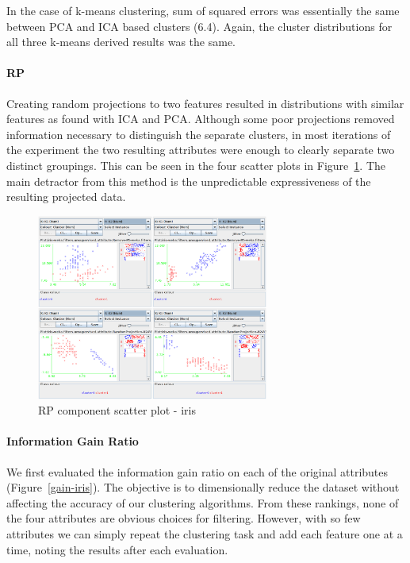\documentclass{sig-alternate}
\begin{document}
In the case of k-means clustering, sum of squared errors was essentially the same between PCA and ICA based clusters (6.4). Again, the cluster distributions for all three k-means derived results was the same.


\paragraph{RP}

Creating random projections to two features resulted in distributions with similar features as found with ICA and PCA. Although some poor projections removed information necessary to distinguish the separate clusters, in most iterations of the experiment the two resulting attributes were enough to clearly separate two distinct groupings. This can be seen in the four scatter plots in Figure~\ref{rp-scatter}. The main detractor from this method is the unpredictable expressiveness of the resulting projected data.


\begin{figure}[!htbp]
    \centering
    \includegraphics[width=3in]{part2/iris/rp.pdf}
    \caption{RP component scatter plot - iris\label{rp-scatter}}
\end{figure} 


\paragraph{Information Gain Ratio}

We first evaluated the information gain ratio on each of the original attributes (Figure~\ref{gain-iris}). The objective is to dimensionally reduce the dataset without affecting the accuracy of our clustering algorithms. From these rankings, none of the four attributes are obvious choices for filtering. However, with so few attributes we can simply repeat the clustering task and add each feature one at a time, noting the results after each evaluation. 
\end{document}
